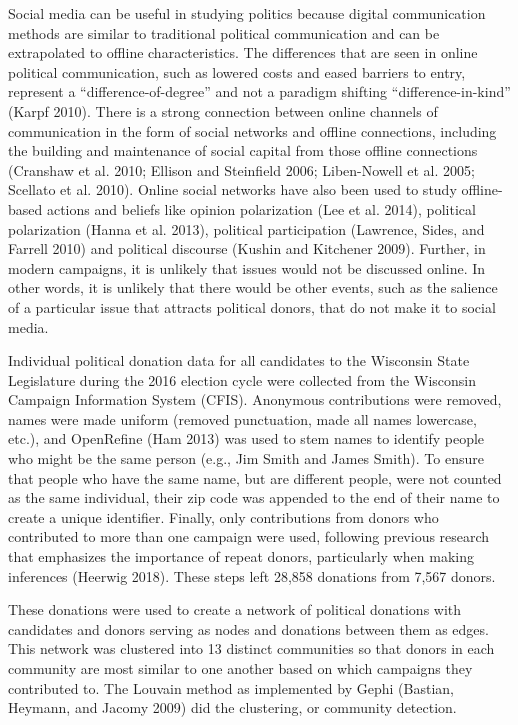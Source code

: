 \documentclass[12pt,]{article}
\begin{document}
Social media can be useful in studying politics because digital
communication methods are similar to traditional political communication
and can be extrapolated to offline characteristics. The differences that
are seen in online political communication, such as lowered costs and
eased barriers to entry, represent a ``difference-of-degree'' and not a
paradigm shifting ``difference-in-kind'' (Karpf 2010). There is a strong
connection between online channels of communication in the form of
social networks and offline connections, including the building and
maintenance of social capital from those offline connections (Cranshaw
et al. 2010; Ellison and Steinfield 2006; Liben-Nowell et al. 2005;
Scellato et al. 2010). Online social networks have also been used to
study offline-based actions and beliefs like opinion polarization (Lee
et al. 2014), political polarization (Hanna et al. 2013), political
participation (Lawrence, Sides, and Farrell 2010) and political
discourse (Kushin and Kitchener 2009). Further, in modern campaigns, it
is unlikely that issues would not be discussed online. In other words,
it is unlikely that there would be other events, such as the salience of
a particular issue that attracts political donors, that do not make it
to social media.

Individual political donation data for all candidates to the Wisconsin
State Legislature during the 2016 election cycle were collected from the
Wisconsin Campaign Information System (CFIS). Anonymous contributions
were removed, names were made uniform (removed punctuation, made all
names lowercase, etc.), and OpenRefine (Ham 2013) was used to stem names
to identify people who might be the same person (e.g., Jim Smith and
James Smith). To ensure that people who have the same name, but are
different people, were not counted as the same individual, their zip
code was appended to the end of their name to create a unique
identifier. Finally, only contributions from donors who contributed to
more than one campaign were used, following previous research that
emphasizes the importance of repeat donors, particularly when making
inferences (Heerwig 2018). These steps left 28,858 donations from 7,567
donors.

These donations were used to create a network of political donations
with candidates and donors serving as nodes and donations between them
as edges. This network was clustered into 13 distinct communities so
that donors in each community are most similar to one another based on
which campaigns they contributed to. The Louvain method as implemented
by Gephi (Bastian, Heymann, and Jacomy 2009) did the clustering, or
community detection.
\end{document}
